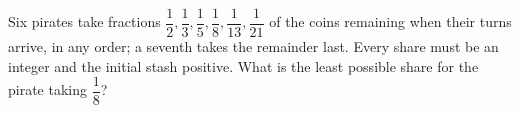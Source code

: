 Six pirates take fractions $\dfrac{1}{2} , \dfrac{1}{3} , \dfrac{1}{5} , \dfrac{1}{8} , \dfrac{1}{13} , \dfrac{1}{21}$ of the coins remaining when their turns arrive, in any order; a seventh takes the remainder last. Every share must be an integer and the initial stash positive. What is the least possible share for the pirate taking $\dfrac{1}{8}$?
